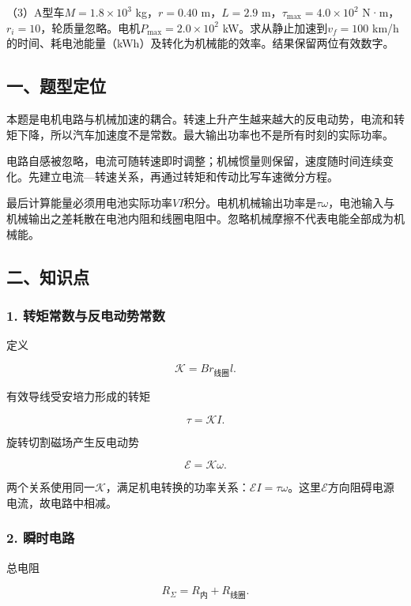 \documentclass[12pt,a4paper,fontset=fandol]{ctexart}
\begin{document}
（3）A型车\(M=1.8\times10^3\) kg，\(r=0.40\) m，\(L=2.9\)
m，\(\tau_{\max}=4.0\times10^2\)
N·m，\(r_i=10\)，轮质量忽略。电机\(P_{\max}=2.0\times10^2\)
kW。求从静止加速到\(v_f=100\)
km/h的时间、耗电池能量（kWh）及转化为机械能的效率。结果保留两位有效数字。

\subsection{一、题型定位}\label{ux4e00ux9898ux578bux5b9aux4f4d-7}

本题是电机电路与机械加速的耦合。转速上升产生越来越大的反电动势，电流和转矩下降，所以汽车加速度不是常数。最大输出功率也不是所有时刻的实际功率。

电路自感被忽略，电流可随转速即时调整；机械惯量则保留，速度随时间连续变化。先建立电流---转速关系，再通过转矩和传动比写车速微分方程。

最后计算能量必须用电池实际功率\(VI\)积分。电机机械输出功率是\(\tau\omega\)，电池输入与机械输出之差耗散在电池内阻和线圈电阻中。忽略机械摩擦不代表电能全部成为机械能。

\subsection{二、知识点}\label{ux4e8cux77e5ux8bc6ux70b9-7}

\subsubsection{1.
转矩常数与反电动势常数}\label{ux8f6cux77e9ux5e38ux6570ux4e0eux53cdux7535ux52a8ux52bfux5e38ux6570}

定义

\[
\mathcal K=B r_{\text{线圈}}l.
\]

有效导线受安培力形成的转矩

\[
\tau=\mathcal K I.
\]

旋转切割磁场产生反电动势

\[
\mathcal E=\mathcal K\omega.
\]

两个关系使用同一\(\mathcal K\)，满足机电转换的功率关系：\(\mathcal EI=\tau\omega\)。这里\(\mathcal E\)方向阻碍电源电流，故电路中相减。

\subsubsection{2. 瞬时电路}\label{ux77acux65f6ux7535ux8def}

总电阻

\[
R_\Sigma=R_{\text{内}}+R_{\text{线圈}}.
\]
\end{document}
